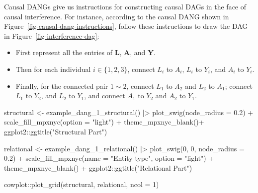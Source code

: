 \documentclass[
  letterpaper,
  DIV=11,
  numbers=noendperiod,
  oneside]{scrreprt}
\newenvironment{Shaded}{\begin{snugshade}}{\end{snugshade}}
\newcommand{\AttributeTok}[1]{\textcolor[rgb]{0.40,0.45,0.13}{#1}}
\newcommand{\DecValTok}[1]{\textcolor[rgb]{0.68,0.00,0.00}{#1}}
\newcommand{\FloatTok}[1]{\textcolor[rgb]{0.68,0.00,0.00}{#1}}
\newcommand{\FunctionTok}[1]{\textcolor[rgb]{0.28,0.35,0.67}{#1}}
\newcommand{\NormalTok}[1]{\textcolor[rgb]{0.00,0.23,0.31}{#1}}
\newcommand{\OtherTok}[1]{\textcolor[rgb]{0.00,0.23,0.31}{#1}}
\newcommand{\SpecialCharTok}[1]{\textcolor[rgb]{0.37,0.37,0.37}{#1}}
\newcommand{\StringTok}[1]{\textcolor[rgb]{0.13,0.47,0.30}{#1}}
\begin{document}
Causal DANGs give us instructions for constructing causal DAGs in the
face of causal interference. For instance, according to the causal DANG
shown in Figure~\ref{fig-causal-dang-instructions}, follow these
instructions to draw the DAG in Figure~\ref{fig-interference-dag}:

\begin{itemize}
\item
  First represent all the entries of \(\mathbf{L}\), \(\mathbf{A}\), and
  \(\mathbf{Y}\).
\item
  Then for each individual \(i\in \{1,2,3\}\), connect \(L_i\) to
  \(A_i\), \(L_i\) to \(Y_i\), and \(A_i\) to \(Y_i\).
\item
  Finally, for the connected pair \(1\sim 2\), connect \(L_1\) to
  \(A_2\) and \(L_2\) to \(A_1\); connect \(L_1\) to \(Y_2\), and
  \(L_2\) to \(Y_1\), and connect \(A_1\) to \(Y_2\) and \(A_2\) to
  \(Y_1\).
\end{itemize}

\begin{Shaded}
\begin{Highlighting}[]
\NormalTok{structural }\OtherTok{\textless{}{-}} \FunctionTok{example\_dang\_1\_structural}\NormalTok{() }\SpecialCharTok{|\textgreater{}}
                    \FunctionTok{plot\_swig}\NormalTok{(}\AttributeTok{node\_radius =} \FloatTok{0.2}\NormalTok{) }\SpecialCharTok{+}
                    \FunctionTok{scale\_fill\_mpxnyc}\NormalTok{(}\AttributeTok{option =} \StringTok{"light"}\NormalTok{) }\SpecialCharTok{+}
                    \FunctionTok{theme\_mpxnyc\_blank}\NormalTok{()}\SpecialCharTok{+}
\NormalTok{                    ggplot2}\SpecialCharTok{::}\FunctionTok{ggtitle}\NormalTok{(}\StringTok{"Structural Part"}\NormalTok{) }

\NormalTok{relational }\OtherTok{\textless{}{-}} \FunctionTok{example\_dang\_1\_relational}\NormalTok{() }\SpecialCharTok{|\textgreater{}}
                    \FunctionTok{plot\_swig}\NormalTok{(}\DecValTok{0}\NormalTok{, }\DecValTok{0}\NormalTok{, }\AttributeTok{node\_radius =} \FloatTok{0.2}\NormalTok{)  }\SpecialCharTok{+}
                    \FunctionTok{scale\_fill\_mpxnyc}\NormalTok{(}\AttributeTok{name =} \StringTok{"Entity type"}\NormalTok{, }\AttributeTok{option =} \StringTok{"light"}\NormalTok{) }\SpecialCharTok{+}
                    \FunctionTok{theme\_mpxnyc\_blank}\NormalTok{() }\SpecialCharTok{+}
\NormalTok{                    ggplot2}\SpecialCharTok{::}\FunctionTok{ggtitle}\NormalTok{(}\StringTok{"Relational Part"}\NormalTok{) }

\NormalTok{cowplot}\SpecialCharTok{::}\FunctionTok{plot\_grid}\NormalTok{(structural, relational, }\AttributeTok{ncol =} \DecValTok{1}\NormalTok{)}
\end{Highlighting}
\end{Shaded}
\end{document}
